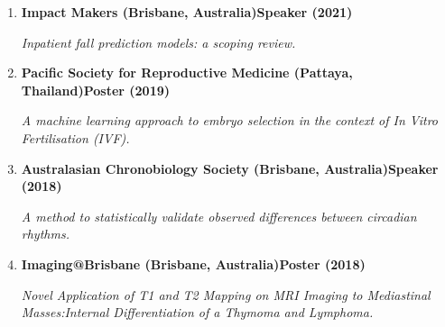 \begin{enumerate}
		\item
		\textbf{Impact Makers (Brisbane, Australia)}\textbf{\hfill Speaker (2021)}\par 
		\textit{Inpatient fall prediction models: a scoping review.}
	\item
		\textbf{Pacific Society for Reproductive Medicine (Pattaya, Thailand)}\textbf{\hfill Poster (2019)}\par 
		\textit{A machine learning approach to embryo selection in the context of In Vitro Fertilisation (IVF).}
	\item
		\textbf{Australasian Chronobiology Society (Brisbane, Australia)}\textbf{\hfill Speaker (2018)}\par 
		\textit{A method to statistically validate observed differences between circadian rhythms.}
	\item
		\textbf{Imaging@Brisbane (Brisbane, Australia)}\textbf{\hfill Poster (2018)}\par 
		\textit{Novel Application of T1 and T2 Mapping on MRI Imaging to Mediastinal Masses:Internal Differentiation of a Thymoma and Lymphoma.}
\end{enumerate}\par
